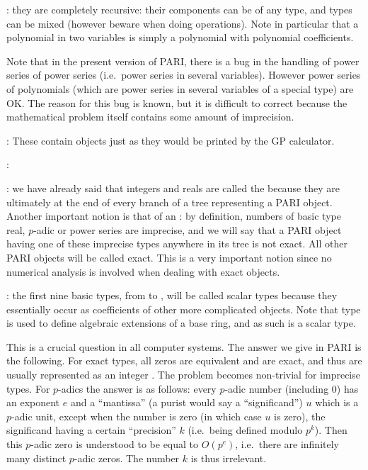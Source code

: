 :
they are completely recursive: their components can be of any type, and types
can be mixed (however beware when doing operations). Note in particular that
a polynomial in two variables is simply a polynomial with polynomial
coefficients.

Note that in the present version \vers{} of PARI, there is a bug in the
handling of power series of power series (i.e.~power series in several
variables).  However power series of polynomials (which are power series in
several variables of a special type) are OK. The reason for this bug is
known, but it is difficult to correct because the mathematical problem itself
contains some amount of imprecision.

: These contain objects just as they would be printed by the
GP calculator.

:

: we have
already said that integers and reals are called the  because they
are ultimately at the end of every branch of a tree representing a PARI
object. Another important notion is that of an {\bf {}}: by
definition, numbers of basic type real, $p$-adic or power series are
imprecise, and we will say that a PARI object having one of these imprecise
types anywhere in its tree is not exact. All other PARI objects will be
called exact. This is a very important notion since no numerical analysis is
involved when dealing with exact objects.

: the first nine basic types, from
 to , will be called scalar types because they
essentially occur as coefficients of other more complicated objects. Note
that type  is used to define algebraic extensions of a base ring,
and as such is a scalar type.

 This is a crucial question in all computer
systems. The answer we give in PARI is the following. For exact types, all
zeros are equivalent and are exact, and thus are usually represented as an
integer . The problem becomes non-trivial for imprecise types. For
$p$-adics the answer is as follows: every $p$-adic number (including 0) has
an exponent $e$ and a ``mantissa'' (a purist would say a ``significand'') $u$
which is a $p$-adic unit, except when the number is zero (in which case $u$
is zero), the significand having a certain ``precision'' $k$ (i.e.~being
defined modulo $p^k$). Then this $p$-adic zero is understood to be equal to
$O(p^e)$, i.e.~there are infinitely many distinct $p$-adic zeros. The number
$k$ is thus irrelevant.

